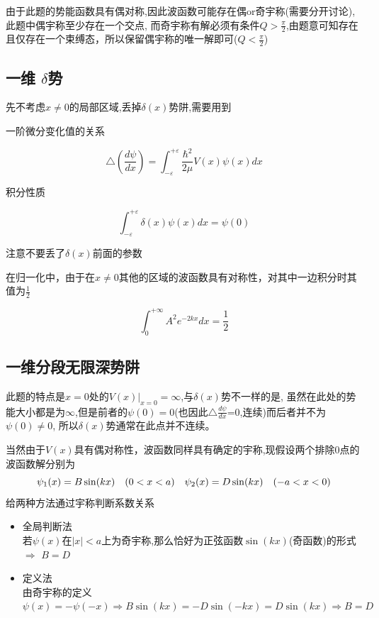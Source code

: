 \documentclass{article}
\begin{document}

            
        
        由于此题的势能函数具有偶对称,因此波函数可能存在偶or奇宇称(需要分开讨论),此题中偶宇称至少存在一个交点,
        而奇宇称有解必须有条件$Q>\frac{\pi}{2}$,由题意可知存在且仅存在一个束缚态，所以保留偶宇称的唯一解即可($Q<\frac{\pi}{2}$)
        
        \subsection{一维 \texorpdfstring{$\delta$}{}势}   %
        
        先不考虑$x\neq0$的局部区域,丢掉$\delta(x)$势阱,需要用到  
        \begin{formal}
            
            \indent 一阶微分变化值的关系  

            $$ \triangle(\frac{d\psi}{dx}) = \int_{-\varepsilon}^{+\varepsilon}\frac{\hbar^2}{2\mu}V(x)\psi(x)dx $$     %

            积分性质

            $$\int_{-\varepsilon}^{+\varepsilon} \delta(x) \psi(x) dx =\psi(0) $$

        \end{formal}
        
        
        注意不要丢了$\delta(x)$前面的参数
        
        
        在归一化中，由于在$x\neq 0$其他的区域的波函数具有对称性，对其中一边积分时其值为$\frac{1}{2}$
        
        $$ \int_{0}^{+\infty}A^2 e^{-2kx} dx = \frac{1}{2} $$
        
        
    \subsection{一维分段无限深势阱}
        此题的特点是$x=0$处的$V(x)|_{x=0}=\infty$,与$\delta(x)$势不一样的是,
        虽然在此处的势能大小都是为$\infty$,但是前者的$\psi(0)=0$(也因此$\triangle \frac{d\psi}{dx}$=0,连续)而后者并不为$\psi(0)\neq0$,
        所以$\delta(x)$势通常在此点并不连续。

        当然由于$V(x)$具有偶对称性，波函数同样具有确定的宇称,现假设两个排除0点的波函数解分别为
        $$\psi_{1} (x)=B\sin(kx) \quad (0<x<a) \quad \psi_{2} (x)=D\sin(kx) \quad (-a<x<0)$$
        给两种方法通过宇称判断系数关系
        \begin{itemize}
            \item 全局判断法   \\
                若$\psi(x)$在$|x|<a$上为奇宇称,那么恰好为正弦函数$\sin(kx)$(奇函数)的形式 $\Rightarrow$ $B = D$ 
            \item 定义法    \\
                由奇宇称的定义$\psi(x)=-\psi(-x) \Rightarrow B\sin(kx)=-D\sin(-kx)=D\sin(kx) \Rightarrow B=D$ 
        \end{itemize}
        
\end{document}
